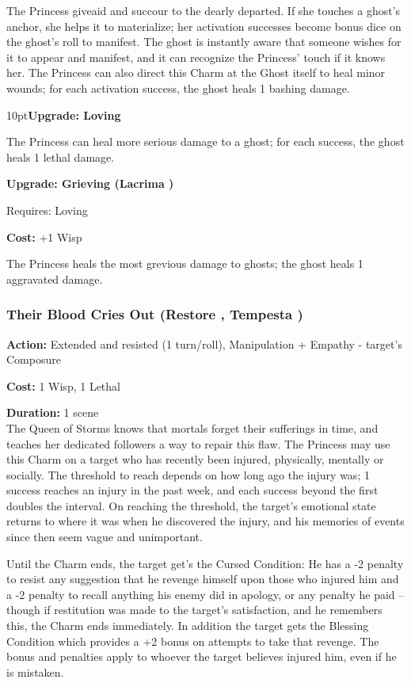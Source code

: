 \noindent The Princess giveaid and succour to the dearly departed. If she touches a ghost's anchor, she helps it to materialize; her activation successes become bonus dice on the ghost's roll to manifest. The ghost is instantly aware that someone wishes for it to appear and manifest, and it can recognize the Princess' touch if it knows her. The Princess can also direct this Charm at the Ghost itself to heal minor wounds; for each activation success, the ghost heals 1 bashing damage.
\begin{myindentpar}{10pt}\textbf{Upgrade: Loving}

The Princess can heal more serious damage to a ghost; for each success, the ghost heals 1 lethal damage.

\textbf{Upgrade: Grieving (Lacrima \textbullet\textbullet)}

\noindent Requires: Loving

\noindent \textbf{Cost:} +1 Wisp

The Princess heals the most grevious damage to ghosts; the ghost heals 1 aggravated damage.\end{myindentpar}

\subsubsection*{Their Blood Cries Out (Restore \textbullet\textbullet, Tempesta \textbullet\textbullet\textbullet)}

\noindent \textbf{Action:} Extended and resisted (1 turn/roll), Manipulation + Empathy - target's Composure

\noindent \textbf{Cost:} 1 Wisp, 1 Lethal
 
\noindent \textbf{Duration:} 1 scene \\

\noindent The Queen of Storms knows that mortals forget their sufferings in time, and teaches her dedicated followers a way to repair this flaw. The Princess may use this Charm on a target who has recently been injured, physically, mentally or socially. The threshold to reach depends on how long ago the injury was; 1 success reaches an injury in the past week, and each success beyond the first doubles the interval. On reaching the threshold, the target's emotional state returns to where it was when he discovered the injury, and his memories of events since then seem vague and unimportant.

Until the Charm ends, the target get's the Cursed Condition: He has a -2 penalty to resist any suggestion that he revenge himself upon those who injured him and a -2 penalty to recall anything his enemy did in apology, or any penalty he paid -- though if restitution was made to the target's satisfaction, and he remembers this, the Charm ends immediately. In addition the target gets the Blessing Condition which provides a +2 bonus on attempts to take that revenge. The bonus and penalties apply to whoever the target believes injured him, even if he is mistaken.

